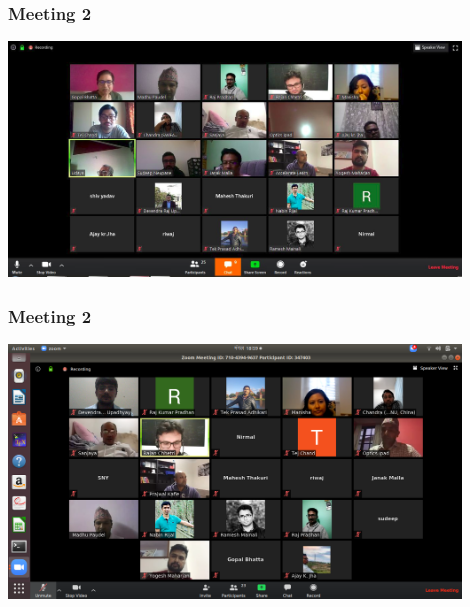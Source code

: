 \documentclass{beamer}
\begin{document}
\begin{frame}
\frametitle{\bf Meeting 2}
\centering
\includegraphics[width=12cm]{21}
\end{frame}
\begin{frame}
\frametitle{\bf Meeting 2}
\centering
\includegraphics[width=12cm]{2}
\end{frame}
\end{document}
